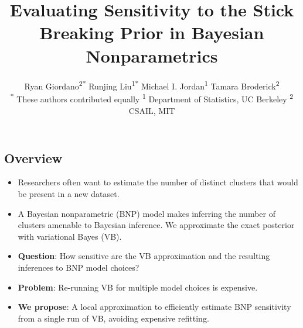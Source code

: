\documentclass[a0,plainsections,30pt]{sciposter}\usepackage[]{graphicx}\usepackage[]{color}
\title{\textcolor{mydarkblue}{
Evaluating Sensitivity to the Stick Breaking Prior in Bayesian Nonparametrics
}}
\author{Ryan Giordano\textsuperscript{2*} \quad
Runjing Liu\textsuperscript{1*} \quad
Michael I. Jordan\textsuperscript{1} \quad
Tamara Broderick\textsuperscript{2} \\
{\large\normalfont\textsuperscript{*}
These authors contributed equally}\quad
 {\large\normalfont\textsuperscript{1}
 Department of Statistics, UC Berkeley \quad \textsuperscript{2} CSAIL, MIT}
 }
\begin{document}

\setlength{\parskip}{0.25em}

\maketitle

\vspace{-1in}






\begin{minipage}[t]{0.45\textwidth}

\begin{mdframed}[style=MyFrame]
\section*{Overview}
\vspace{-0.3in}
\begin{itemize}
\item Researchers often want to estimate the number of distinct clusters
that would be present in a new dataset.

\item A Bayesian nonparametric (BNP) model makes inferring the number of
clusters amenable to Bayesian inference.
We approximate the exact posterior with variational Bayes (VB).

\item \textbf{Question}: How sensitive are the
VB approximation and the resulting inferences to BNP model choices?

\item \textbf{Problem}: Re-running VB for multiple model choices is expensive.

\item \textbf{We propose}: A local approximation to efficiently
estimate BNP sensitivity from a single run of VB, avoiding
expensive refitting.

\end{itemize}
\end{mdframed}
\vspace{-0.7in}


\end{minipage}
\end{document}
